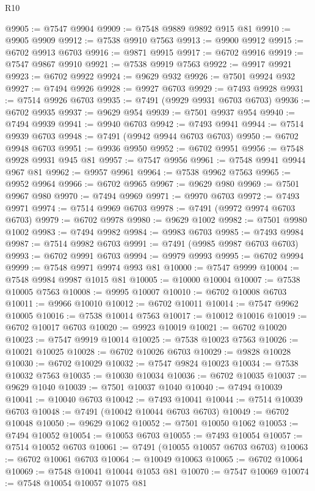 \begin{lexlean}{R10}
\begin{coremodule}
@9905 := @7547 @9904
@9909 := @7548 @9889 @9892 @915 @81
@9910 := @9905 @9909
@9912 := @7538 @9910 @7563
@9913 := @9900 @9912
@9915 := @6702 @9913 @6703
@9916 := @9871 @9915
@9917 := @6702 @9916
@9919 := @7547 @9867 @9910
@9921 := @7538 @9919 @7563
@9922 := @9917 @9921
@9923 := @6702 @9922
@9924 := @9629 @932
@9926 := @7501 @9924 @932
@9927 := @7494 @9926
@9928 := @9927 @6703
@9929 := @7493 @9928
@9931 := @7514 @9926 @6703
@9935 := @7491 (@9929 @9931 @6703 @6703)
@9936 := @6702 @9935
@9937 := @9629 @954
@9939 := @7501 @9937 @954
@9940 := @7494 @9939
@9941 := @9940 @6703
@9942 := @7493 @9941
@9944 := @7514 @9939 @6703
@9948 := @7491 (@9942 @9944 @6703 @6703)
@9950 := @6702 @9948 @6703
@9951 := @9936 @9950
@9952 := @6702 @9951
@9956 := @7548 @9928 @9931 @945 @81
@9957 := @7547 @9956
@9961 := @7548 @9941 @9944 @967 @81
@9962 := @9957 @9961
@9964 := @7538 @9962 @7563
@9965 := @9952 @9964
@9966 := @6702 @9965
@9967 := @9629 @980
@9969 := @7501 @9967 @980
@9970 := @7494 @9969
@9971 := @9970 @6703
@9972 := @7493 @9971
@9974 := @7514 @9969 @6703
@9978 := @7491 (@9972 @9974 @6703 @6703)
@9979 := @6702 @9978
@9980 := @9629 @1002
@9982 := @7501 @9980 @1002
@9983 := @7494 @9982
@9984 := @9983 @6703
@9985 := @7493 @9984
@9987 := @7514 @9982 @6703
@9991 := @7491 (@9985 @9987 @6703 @6703)
@9993 := @6702 @9991 @6703
@9994 := @9979 @9993
@9995 := @6702 @9994
@9999 := @7548 @9971 @9974 @993 @81
@10000 := @7547 @9999
@10004 := @7548 @9984 @9987 @1015 @81
@10005 := @10000 @10004
@10007 := @7538 @10005 @7563
@10008 := @9995 @10007
@10010 := @6702 @10008 @6703
@10011 := @9966 @10010
@10012 := @6702 @10011
@10014 := @7547 @9962 @10005
@10016 := @7538 @10014 @7563
@10017 := @10012 @10016
@10019 := @6702 @10017 @6703
@10020 := @9923 @10019
@10021 := @6702 @10020
@10023 := @7547 @9919 @10014
@10025 := @7538 @10023 @7563
@10026 := @10021 @10025
@10028 := @6702 @10026 @6703
@10029 := @9828 @10028
@10030 := @6702 @10029
@10032 := @7547 @9824 @10023
@10034 := @7538 @10032 @7563
@10035 := @10030 @10034
@10036 := @6702 @10035
@10037 := @9629 @1040
@10039 := @7501 @10037 @1040
@10040 := @7494 @10039
@10041 := @10040 @6703
@10042 := @7493 @10041
@10044 := @7514 @10039 @6703
@10048 := @7491 (@10042 @10044 @6703 @6703)
@10049 := @6702 @10048
@10050 := @9629 @1062
@10052 := @7501 @10050 @1062
@10053 := @7494 @10052
@10054 := @10053 @6703
@10055 := @7493 @10054
@10057 := @7514 @10052 @6703
@10061 := @7491 (@10055 @10057 @6703 @6703)
@10063 := @6702 @10061 @6703
@10064 := @10049 @10063
@10065 := @6702 @10064
@10069 := @7548 @10041 @10044 @1053 @81
@10070 := @7547 @10069
@10074 := @7548 @10054 @10057 @1075 @81

\end{coremodule}
\end{lexlean}
